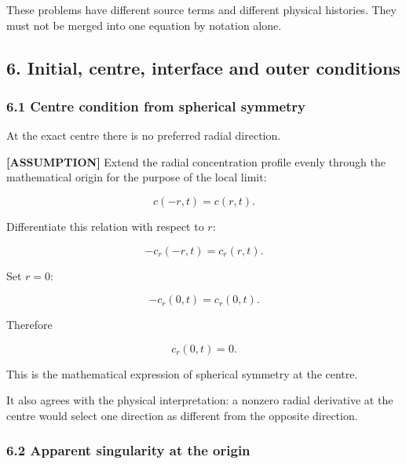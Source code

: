 \documentclass[11pt,a4paper]{article}
\begin{document}
These problems have different source terms and different physical histories. They must not be merged into one equation by notation alone.

\subsection*{6. Initial, centre, interface and outer conditions}

\subsubsection*{6.1 Centre condition from spherical symmetry}

At the exact centre there is no preferred radial direction.

\textbf{[ASSUMPTION]} Extend the radial concentration profile evenly through the mathematical origin for the purpose of the local limit:

\begin{equation}
c(-r,t)=c(r,t).
\tag{TRISO-BC-100}
\label{eq:triso-bc-100}
\end{equation}

Differentiate this relation with respect to $r$:

\begin{equation}
-c_r(-r,t)=c_r(r,t).
\tag{TRISO-BC-101}
\label{eq:triso-bc-101}
\end{equation}

Set $r=0$:

\begin{equation}
-c_r(0,t)=c_r(0,t).
\tag{TRISO-BC-102}
\label{eq:triso-bc-102}
\end{equation}

Therefore

\begin{equation}
\boxed{c_r(0,t)=0.}
\tag{TRISO-BC-103}
\label{eq:triso-bc-103}
\end{equation}

This is the mathematical expression of spherical symmetry at the centre.

It also agrees with the physical interpretation: a nonzero radial derivative at the centre would select one direction as different from the opposite direction.

\subsubsection*{6.2 Apparent singularity at the origin}
\end{document}
